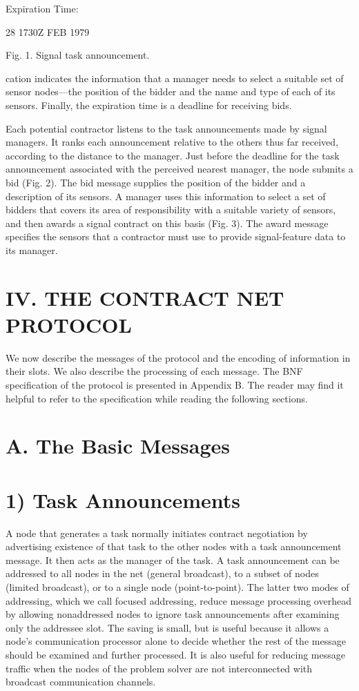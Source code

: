\documentclass[
]{article}
\begin{document}
Expiration Time:

28 1730Z FEB 1979

Fig. 1. Signal task announcement.

cation indicates the information that a manager needs to select a
suitable set of sensor nodes---the position of the bidder and the name
and type of each of its sensors. Finally, the expiration time is a
deadline for receiving bids.

Each potential contractor listens to the task announcements made by
signal managers. It ranks each announcement relative to the others thus
far received, according to the distance to the manager. Just before the
deadline for the task announcement associated with the perceived nearest
manager, the node submits a bid (Fig. 2). The bid message supplies the
position of the bidder and a description of its sensors. A manager uses
this information to select a set of bidders that covers its area of
responsibility with a suitable variety of sensors, and then awards a
signal contract on this basis (Fig. 3). The award message specifies the
sensors that a contractor must use to provide signal-feature data to its
manager.

\section{IV. THE CONTRACT NET
PROTOCOL}\label{iv.-the-contract-net-protocol}

We now describe the messages of the protocol and the encoding of
information in their slots. We also describe the processing of each
message. The BNF specification of the protocol is presented in Appendix
B. The reader may find it helpful to refer to the specification while
reading the following sections.

\section{A. The Basic Messages}\label{a.-the-basic-messages}

\section{1) Task Announcements}\label{task-announcements}

A node that generates a task normally initiates contract negotiation by
advertising existence of that task to the other nodes with a task
announcement message. It then acts as the manager of the task. A task
announcement can be addressed to all nodes in the net (general
broadcast), to a subset of nodes (limited broadcast), or to a single
node (point-to-point). The latter two modes of addressing, which we call
focused addressing, reduce message processing overhead by allowing
nonaddressed nodes to ignore task announcements after examining only the
addressee slot. The saving is small, but is useful because it allows a
node's communication processor alone to decide whether the rest of the
message should be examined and further processed. It is also useful for
reducing message traffic when the nodes of the problem solver are not
interconnected with broadcast communication channels.
\end{document}
